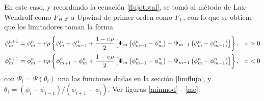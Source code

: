 \documentclass[11pt,twoside,openright,spanish]{report}
\numberwithin{equation}{chapter}
\numberwithin{figure}{chapter}
\numberwithin{table}{chapter}
\begin{document}
\begin{itemize}
	\noindent
	En este caso, y recordando la ecuación \eqref{flujototal}, se tomó al método de Lax-Wendroff como $F_H$ y a Upwind de primer orden como $F_L$, con lo que se obtiene que los limitadores toman la forma
	\begin{align}
	\phi^{n+1}_m=\phi^n_m-\upsilon\rho\left\{\phi^n_m-\phi_{m-1}^n+\frac{1-\upsilon\rho}{2}\left[\Psi_m\left(\phi_{m+1}^n-\phi_m^n\right)-\Psi_{m-1}\left(\phi_m^n-\phi_{m-1}^n\right)\right]\right\},\hspace{0.3cm}\upsilon>0\\
	\phi^{n+1}_m=\phi^n_m-\upsilon\rho\left\{\phi^n_{m+1}-\phi_{m}^n+\frac{1-\upsilon\rho}{2}\left[\Psi_m\left(\phi_{m+1}^n-\phi_m^n\right)-\Psi_{m-1}\left(\phi_m^n-\phi_{m-1}^n\right)\right]\right\},\hspace{0.3cm}\upsilon<0
	\end{align}
	con $\Psi_i=\Psi\left(\theta_i\right)$ una las funciones dadas en la sección \ref{limflujo}, y $\theta_i=\left(\phi_i-\phi_{i-1}\right)/\left(\phi_{i+1}-\phi_i\right)$.  Ver figuras \ref{minmod} - \ref{mc}.
\end{itemize}
\end{document}
